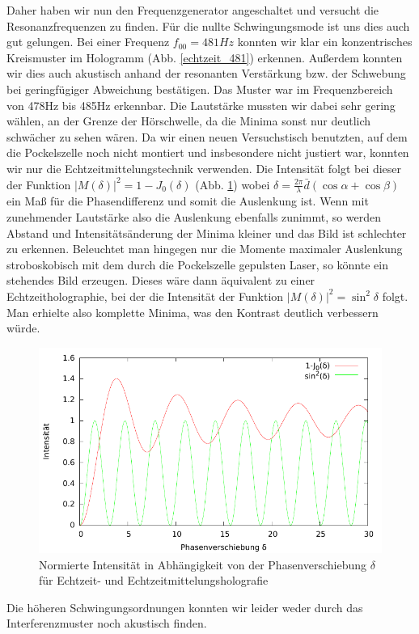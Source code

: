 Daher haben wir nun den Frequenzgenerator angeschaltet und versucht die Resonanzfrequenzen zu finden. Für die nullte Schwingungsmode ist uns dies auch gut gelungen. Bei einer Frequenz $f_{00} = 481 Hz$ konnten wir klar ein konzentrisches Kreismuster im Hologramm (Abb. \ref{echtzeit_481}) erkennen. Außerdem konnten wir dies auch akustisch anhand der resonanten Verstärkung bzw. der Schwebung bei geringfügiger Abweichung bestätigen. Das Muster war im Frequenzbereich von 478Hz bis 485Hz erkennbar. Die Lautstärke mussten wir dabei sehr gering wählen, an der Grenze der Hörschwelle, da die Minima sonst nur deutlich schwächer zu sehen wären. Da wir einen neuen Versuchstisch benutzten, auf dem die Pockelszelle noch nicht montiert und insbesondere nicht justiert war, konnten wir nur die Echtzeitmittelungstechnik verwenden. Die Intensität folgt bei dieser der Funktion $|M(\delta)|^2 = 1 - J_0(\delta)$ (Abb. \ref{echtzeit_intensität}) wobei $\delta = \frac{2\pi}{\lambda}\bar{d}(\cos \alpha + \cos \beta)$ ein Maß für die Phasendifferenz und somit die Auslenkung ist. Wenn mit zunehmender Lautstärke also die Auslenkung ebenfalls zunimmt, so werden Abstand und Intensitätsänderung der Minima kleiner und das Bild ist schlechter zu erkennen. Beleuchtet man hingegen nur die Momente maximaler Auslenkung stroboskobisch mit dem durch die Pockelszelle gepulsten Laser, so könnte ein stehendes Bild erzeugen. Dieses wäre dann äquivalent zu einer Echtzeitholographie, bei der die Intensität der Funktion $|M(\delta)|^2 = \sin^2 \delta$ folgt. Man erhielte also komplette Minima, was den Kontrast deutlich verbessern würde.

\begin{figure}[H]
\includegraphics[width=\textwidth]{Graphen/echtzeitmittelung.pdf}
\caption{Normierte Intensität in Abhängigkeit von der Phasenverschiebung $\delta$ für Echtzeit- und Echtzeitmittelungsholografie}
\label{echtzeit_intensität}
\end{figure}

Die höheren Schwingungsordnungen konnten wir leider weder durch das Interferenzmuster noch akustisch finden.  %